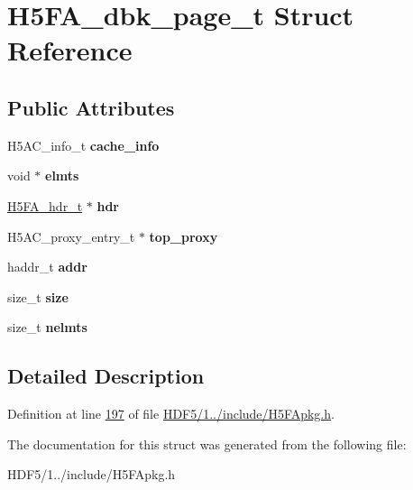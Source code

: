 \hypertarget{struct_h5_f_a__dbk__page__t}{}\section{H5\+F\+A\+\_\+dbk\+\_\+page\+\_\+t Struct Reference}
\label{struct_h5_f_a__dbk__page__t}
\subsection*{Public Attributes}
\begin{DoxyCompactItemize}
\item 
\mbox{\label{struct_h5_f_a__dbk__page__t_a192274b1078a4cdf317c722bb4784c33}} 
H5\+A\+C\+\_\+info\+\_\+t {\bfseries cache\+\_\+info}
\item 
\mbox{\label{struct_h5_f_a__dbk__page__t_a23196b91ae40078a53d903d38462d6cc}} 
void $\ast$ {\bfseries elmts}
\item 
\mbox{\label{struct_h5_f_a__dbk__page__t_a95241df0bd9a16b417c91f42602d5926}} 
\hyperlink{struct_h5_f_a__hdr__t}{H5\+F\+A\+\_\+hdr\+\_\+t} $\ast$ {\bfseries hdr}
\item 
\mbox{\label{struct_h5_f_a__dbk__page__t_a9bfc32b5c9e0352e1dfd7d71abdfd25d}} 
H5\+A\+C\+\_\+proxy\+\_\+entry\+\_\+t $\ast$ {\bfseries top\+\_\+proxy}
\item 
\mbox{\label{struct_h5_f_a__dbk__page__t_af43381e9df9ed2bd59556becb174a23a}} 
haddr\+\_\+t {\bfseries addr}
\item 
\mbox{\label{struct_h5_f_a__dbk__page__t_a68d1b31a3ec84cf17015dccabd53915f}} 
size\+\_\+t {\bfseries size}
\item 
\mbox{\label{struct_h5_f_a__dbk__page__t_ab13b012f2a21afe2686a2847ea3b2016}} 
size\+\_\+t {\bfseries nelmts}
\end{DoxyCompactItemize}


\subsection{Detailed Description}


Definition at line \hyperlink{_h_d_f5_21_810_81_2include_2_h5_f_apkg_8h_source_l00197}{197} of file \hyperlink{_h_d_f5_21_810_81_2include_2_h5_f_apkg_8h_source}{H\+D\+F5/1../include/\+H5\+F\+Apkg.\+h}.



The documentation for this struct was generated from the following file\+:\begin{DoxyCompactItemize}
\item 
H\+D\+F5/1../include/\+H5\+F\+Apkg.\+h\end{DoxyCompactItemize}
